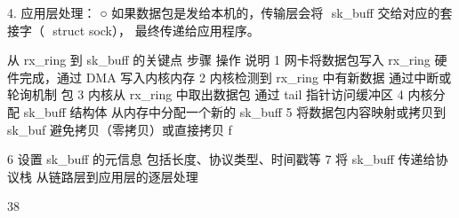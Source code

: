 4. 应用层处理：
    ○ 如果数据包是发给本机的，传输层会将 ﻿      sk_buff﻿ 交给对应的套接字（ ﻿
                                                  struct sock﻿），
      最终传递给应用程序。

从 ﻿rx_ring﻿ 到 ﻿sk_buff﻿ 的关键点
 步骤 操作                        说明
 1      网卡将数据包写入 ﻿rx_ring﻿    硬件完成，通过 DMA 写入内核内存
 2      内核检测到 ﻿rx_ring﻿ 中有新数据 通过中断或轮询机制
        包
 3      内核从 ﻿rx_ring﻿ 中取出数据包 通过 ﻿tail﻿ 指针访问缓冲区
 4      内核分配 ﻿sk_buff﻿ 结构体    从内存中分配一个新的 ﻿sk_buff﻿
 5      将数据包内容映射或拷贝到 ﻿sk_buf 避免拷贝（零拷贝）或直接拷贝
      f﻿

6     设置 ﻿sk_buff﻿ 的元信息        包括长度、协议类型、时间戳等
7     将 ﻿sk_buff﻿ 传递给协议栈       从链路层到应用层的逐层处理




                                                              38
